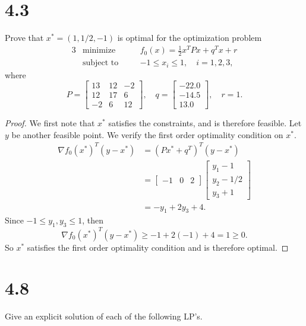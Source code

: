 \documentclass[12pt]{article}
\begin{document}
\section*{4.3}
Prove that $x^*=(1,1/2,-1)$ is optimal for the optimization problem
\begin{alignat*}{3}
    &\text{minimize}    &\quad& f_0(x) = \frac12x^TPx+q^Tx+r \\
    &\text{subject to}  &\quad& -1\leq x_i \leq 1, \quad i=1,2,3,
\end{alignat*}
where
\[P = 
    \begin{bmatrix}
        13 & 12 & -2 \\
        12 & 17 & 6 \\
        -2 & 6 & 12
    \end{bmatrix},
    \quad
    q=
    \begin{bmatrix}
        -22.0 \\
        -14.5 \\
        13.0
    \end{bmatrix},
    \quad
    r=1.
\]

\begin{proof}
    We first note that $x^*$ satisfies the constraints, and is therefore feasible. Let $y$ be another feasible point. We verify the first order optimality condition on $x^*$.
    \begin{align*}
        \nabla f_0(x^*)^T(y-x^*)
            &= (Px^* + q^T)^T(y-x^*) \\
            &=  \begin{bmatrix}
                    -1 & 0 & 2
                \end{bmatrix}
                \begin{bmatrix}
                    y_1-1 \\
                    y_2 - 1/2 \\
                    y_3 + 1
                \end{bmatrix} \\
            &= -y_1+2y_3+4.
    \end{align*}
    Since $-1\leq y_1,y_3 \leq 1$, then
    \[\nabla f_0(x^*)^T(y-x^*) \geq -1+2(-1)+4 = 1 \geq 0.\]
    So $x^*$ satisfies the first order optimality condition and is therefore optimal.
    
\end{proof}

\section*{4.8}
Give an explicit solution of each of the following LP's.
\end{document}
